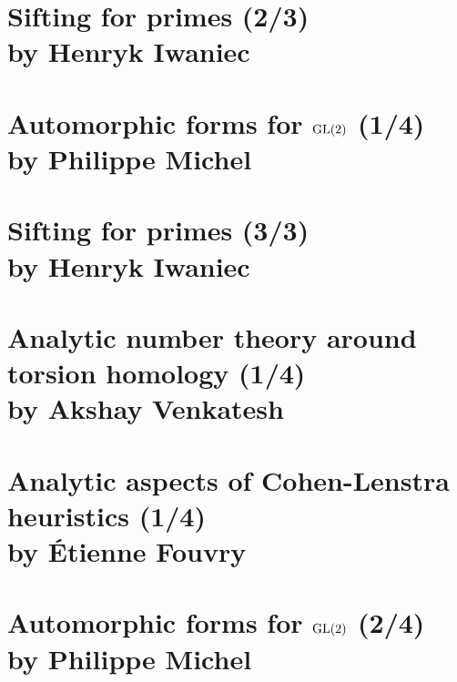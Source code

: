 \documentclass[12pt,amsfont]{amsart}
\begin{document}
\newpage
\renewcommand{\thesubsection}{\arabic{section}.\arabic{subsection}}
\section{Sifting for primes (2/3)\\ by Henryk Iwaniec}\label{4}

\newpage
\renewcommand{\thesubsection}{\arabic{section}.\arabic{subsection}}
\section{Automorphic forms for $\operatorname{GL}(2)$ (1/4)\\ by Philippe Michel}\label{5}



\newpage
\section{Sifting for primes (3/3)\\ by Henryk Iwaniec}\label{1}

\begingroup
\renewcommand{\addcontentsline}[3]{}%
\endgroup


\newpage
\renewcommand{\thesubsection}{\arabic{section}.\arabic{subsection}}
\section{Analytic number theory around torsion homology (1/4) \\ by Akshay Venkatesh}\label{2}


\newpage
\renewcommand{\thesubsection}{\arabic{section}.\arabic{subsection}}
\section{Analytic aspects of Cohen-Lenstra heuristics (1/4)
\\ by \'{E}tienne Fouvry}\label{3}

\newpage
\renewcommand{\thesubsection}{\arabic{section}.\arabic{subsection}}
\section{Automorphic forms for $\operatorname{GL}(2)$ (2/4)\\ by Philippe Michel}\label{19}

\newpage
\renewcommand{\thesubsection}{\arabic{section}.\arabic{subsection}}
\end{document}
